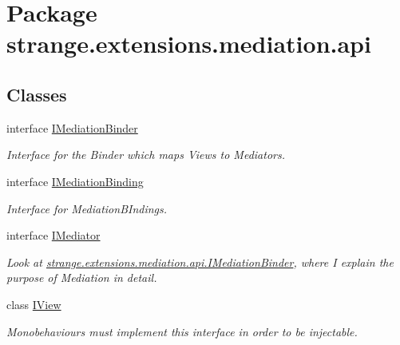 \hypertarget{namespacestrange_1_1extensions_1_1mediation_1_1api}{\section{Package strange.\-extensions.\-mediation.\-api}
\label{namespacestrange_1_1extensions_1_1mediation_1_1api}
}
\subsection*{Classes}
\begin{DoxyCompactItemize}
\item 
interface \hyperlink{interfacestrange_1_1extensions_1_1mediation_1_1api_1_1_i_mediation_binder}{I\-Mediation\-Binder}
\begin{DoxyCompactList}\small\item\em Interface for the Binder which maps Views to Mediators. \end{DoxyCompactList}\item 
interface \hyperlink{interfacestrange_1_1extensions_1_1mediation_1_1api_1_1_i_mediation_binding}{I\-Mediation\-Binding}
\begin{DoxyCompactList}\small\item\em Interface for Mediation\-B\-Indings. \end{DoxyCompactList}\item 
interface \hyperlink{interfacestrange_1_1extensions_1_1mediation_1_1api_1_1_i_mediator}{I\-Mediator}
\begin{DoxyCompactList}\small\item\em Look at \hyperlink{interfacestrange_1_1extensions_1_1mediation_1_1api_1_1_i_mediation_binder}{strange.\-extensions.\-mediation.\-api.\-I\-Mediation\-Binder}, where I explain the purpose of Mediation in detail. \end{DoxyCompactList}\item 
class \hyperlink{interfacestrange_1_1extensions_1_1mediation_1_1api_1_1_i_view}{I\-View}
\begin{DoxyCompactList}\small\item\em Monobehaviours must implement this interface in order to be injectable. \end{DoxyCompactList}\end{DoxyCompactItemize}
